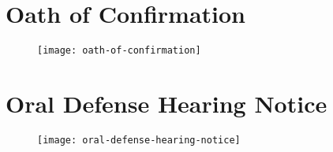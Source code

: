 \chapter{Oath of Confirmation}
\begin{figure}[H]
\texttt{[image: oath-of-confirmation]}
\centering
\end{figure}

\chapter{Oral Defense Hearing Notice}
\begin{figure}[h]
\texttt{[image: oral-defense-hearing-notice]}
\centering
\end{figure}